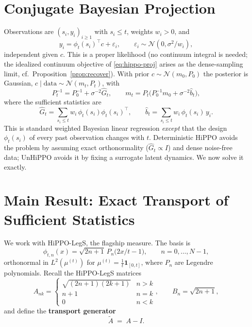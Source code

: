 \documentclass[11pt]{article}
\newcommand{\N}{\mathcal{N}}
\newcommand{\mut}{\mu^{(t)}}
\newcommand{\At}{\widetilde{A}}
\newcommand{\Gh}{\widehat{G}}
\newcommand{\bh}{\widehat{b}}
\begin{document}
\section{Conjugate Bayesian Projection}\label{sec:conjugate}

Observations are $(s_i,y_i)_{i\ge1}$ with $s_i\le t$, weights $w_i>0$, and
\begin{equation}
    y_i=\phi_t(s_i)^\top c+\varepsilon_i,\qquad \varepsilon_i\sim\N(0,\sigma^2/w_i),
    \label{eq:obsmodel}
\end{equation}
independent given $c$. This is a proper likelihood (no continuum integral is needed; the idealized continuum objective of \eqref{eq:hippo-proj} arises as the dense-sampling limit, cf.\ Proposition~\ref{prop:recover}). With prior $c\sim\N(m_0,P_0)$ the posterior is Gaussian, $c\mid\text{data}\sim\N(m_t,P_t)$, with
\begin{equation}
    P_t^{-1}=P_0^{-1}+\sigma^{-2}\Gh_t,\qquad
    m_t=P_t\big(P_0^{-1}m_0+\sigma^{-2}\bh_t\big),
    \label{eq:posterior}
\end{equation}
where the sufficient statistics are
\begin{equation}
    \Gh_t=\sum_{s_i\le t} w_i\,\phi_t(s_i)\phi_t(s_i)^\top,
    \qquad
    \bh_t=\sum_{s_i\le t} w_i\,\phi_t(s_i)\,y_i.
    \label{eq:suffstats}
\end{equation}
This is standard weighted Bayesian linear regression \emph{except} that the design $\phi_t(s_i)$ of every past observation changes with $t$. Deterministic HiPPO avoids the problem by assuming exact orthonormality ($\Gh_t\propto I$) and dense noise-free data; UnHiPPO avoids it by fixing a surrogate latent dynamics. We now solve it exactly.

\section{Main Result: Exact Transport of Sufficient Statistics}\label{sec:transport}

We work with HiPPO-LegS, the flagship measure. The basis is
\begin{equation}
    \phi_{t,n}(x)=\sqrt{2n+1}\,P_n\!\big(2x/t-1\big),\qquad n=0,\dots,N-1,
\end{equation}
orthonormal in $L^2(\mut)$ for $\mut=\tfrac1t\mathbf 1_{[0,t]}$, where $P_n$ are Legendre polynomials. Recall the HiPPO-LegS matrices
\begin{equation}
    A_{nk}=\begin{cases}\sqrt{(2n+1)(2k+1)}&n>k\\ n+1&n=k\\ 0&n<k\end{cases},
    \qquad B_n=\sqrt{2n+1},
\end{equation}
and define the \textbf{transport generator}
\begin{equation}
    \boxed{\ \At \;=\; A-I.\ }
\end{equation}
\end{document}
